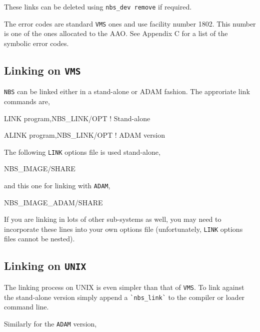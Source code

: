 \documentclass[twoside,11pt,nolof]{starlink}
\begin{document}
\begin{terminalv}
\end{terminalv}

These links can be deleted using \texttt{nbs\_dev remove} if required.

The error codes are standard \texttt{VMS} ones and use facility number 1802. This
number is one of the ones allocated to the AAO. See Appendix C for a list of
the symbolic error codes.

\subsection{Linking on \texttt{VMS}}

\texttt{NBS} can be linked either in a stand-alone or ADAM fashion. The
approriate link commands are,

\begin{terminalv}
LINK program,NBS_LINK/OPT        ! Stand-alone

ALINK program,NBS_LINK/OPT       ! ADAM version
\end{terminalv}

The following \texttt{LINK} options file is used stand-alone,

\begin{terminalv}
NBS_IMAGE/SHARE
\end{terminalv}

and this one for linking with \texttt{ADAM},

\begin{terminalv}
NBS_IMAGE_ADAM/SHARE
\end{terminalv}

If you are linking in lots of other sub-systems as well, you may need to
incorporate these lines into your own options file (unfortunately, \texttt{LINK}
options files cannot be nested).

\subsection{Linking on \texttt{UNIX}}

The linking process on UNIX is even simpler than that of \texttt{VMS}. To link
against the stand-alone version simply append a \verb+`nbs_link`+ to the
compiler or loader command line.

\begin{terminalv}
\end{terminalv}

Similarly for the \texttt{ADAM} version,
\end{document}

